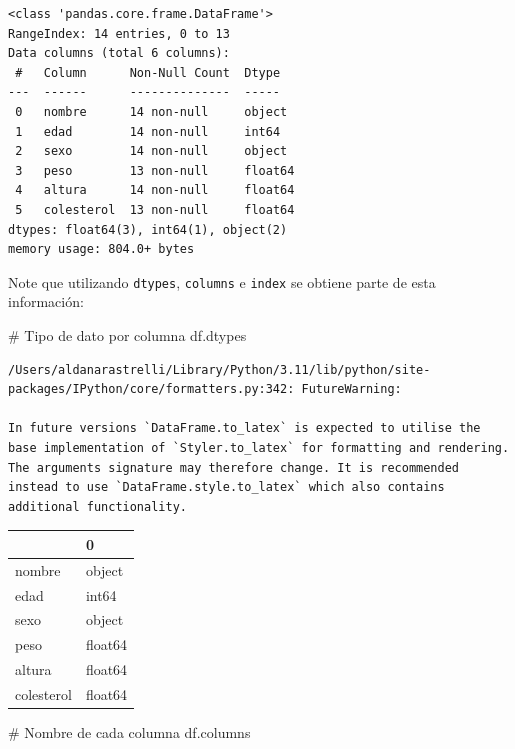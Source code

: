 \documentclass[
  letterpaper,
  DIV=11,
  numbers=noendperiod]{scrreprt}
\newenvironment{Shaded}{\begin{snugshade}}{\end{snugshade}}
\newcommand{\CommentTok}[1]{\textcolor[rgb]{0.37,0.37,0.37}{#1}}
\newcommand{\NormalTok}[1]{\textcolor[rgb]{0.00,0.23,0.31}{#1}}
\begin{document}
\begin{verbatim}
<class 'pandas.core.frame.DataFrame'>
RangeIndex: 14 entries, 0 to 13
Data columns (total 6 columns):
 #   Column      Non-Null Count  Dtype  
---  ------      --------------  -----  
 0   nombre      14 non-null     object 
 1   edad        14 non-null     int64  
 2   sexo        14 non-null     object 
 3   peso        13 non-null     float64
 4   altura      14 non-null     float64
 5   colesterol  13 non-null     float64
dtypes: float64(3), int64(1), object(2)
memory usage: 804.0+ bytes
\end{verbatim}

Note que utilizando \texttt{dtypes}, \texttt{columns} e \texttt{index}
se obtiene parte de esta información:

\begin{Shaded}
\begin{Highlighting}[]
\CommentTok{\# Tipo de dato por columna}
\NormalTok{df.dtypes}
\end{Highlighting}
\end{Shaded}

\begin{verbatim}
/Users/aldanarastrelli/Library/Python/3.11/lib/python/site-packages/IPython/core/formatters.py:342: FutureWarning:

In future versions `DataFrame.to_latex` is expected to utilise the base implementation of `Styler.to_latex` for formatting and rendering. The arguments signature may therefore change. It is recommended instead to use `DataFrame.style.to_latex` which also contains additional functionality.
\end{verbatim}

\begin{tabular}{ll}
\toprule
{} &        0 \\
\midrule
nombre     &   object \\
edad       &    int64 \\
sexo       &   object \\
peso       &  float64 \\
altura     &  float64 \\
colesterol &  float64 \\
\bottomrule
\end{tabular}

\begin{Shaded}
\begin{Highlighting}[]
\CommentTok{\# Nombre de cada columna}
\NormalTok{df.columns}
\end{Highlighting}
\end{Shaded}
\end{document}
